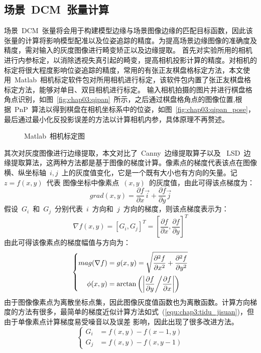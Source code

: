 \subsection{场景~DCM~张量计算}
\label{sec:Edge Point Mapping}
场景~DCM~张量将会用于构建模型边缘与场景图像边缘的匹配目标函数，因此该张量的计算将影响模型配准以及位姿追踪的精度。为提高场景边缘图像的准确度及精度，需对输入的灰度图像进行畸变矫正以及边缘提取。
首先对实验所用的相机进行内参标定，以消除透视失真引起的畸变，提高相机投影计算的精度。对相机的标定将很大程度影响位姿追踪的精度，常用的有张正友棋盘格标定方法，本文使用~Matlab~相机标定软件包对所用相机进行标定，该软件包内置了张正友棋盘格标定方法，能够对单目、双目相机进行标定。
输入相机拍摄的图片并进行棋盘格角点识别，如图~\ref{fig:chap03:qipan}~所示，之后通过棋盘格角点的图像位置,根据~PnP~算法以得到棋盘在相机坐标系中的位姿，如图~\ref{fig:chap03:qipan_pose}，最后通过最小化反投影误差的方法以计算相机内参，具体原理不再赘述。
\begin{figure}[t] %
  \centering%
  \caption{Matlab~相机标定图}
  \label{fig:chap03:matlab_calib}
\end{figure}
其次对灰度图像进行边缘提取，本文对比了~Canny~边缘提取算子以及
~LSD~边缘提取算法，这两种方法都是基于图像的梯度计算。像素点的梯度代表该点在图像横、纵坐标轴~$i,j$~上的灰度值变化，它是一个既有大小也有方向的矢量。记~$z=f(x,y)$~代表
图像坐标中像素点~$(x,y)$~的灰度值，由此可得该点梯度为：
\begin{equation}
grad(x,y)=\frac{\partial f}{\partial x}\vec i+\frac{\partial f}{\partial y}\vec j
\end{equation}
假设~$G_i$~和~$G_j$~分别代表~$i$~方向和~$j$~方向的梯度，则该点梯度表示为：
\begin{equation}
  \nabla f(x,y)=[G_i,G_j]^T=\left[\frac{\partial f}{\partial x},\frac{\partial f}{\partial y}\right]^T
\end{equation}
由此可得该像素点的梯度幅值与方向为：
\begin{equation}
  \left\{
    \begin{aligned}{}
    mag(\nabla f)&=g(x,y)=\sqrt{\frac{\partial ^2f}{\partial x^2}+\frac{\partial ^2f}{\partial y^2}} \\
    \phi(x,y)&=\arctan\left(\left| \frac{\partial f}{\partial y} \middle / \frac{\partial f}{\partial x}\right|\right)
    \end{aligned}
    \right.
\end{equation}
由于图像像素点为离散坐标点集，因此图像灰度值函数也为离散函数。计算方向梯度的方法有很多，最简单的梯度近似计算方法如式~(\ref{equ:chap3:tidu_jisuan})，但由于单像素点计算梯度易受噪音以及误差
影响，因此出现了很多改进方法。
\begin{equation}
  \label{equ:chap3:tidu_jisuan}
  \left\{
    \begin{aligned}{}
    G_i&=f(x,y)-f(x-1,y) \\
    G_j&=f(x,y)-f(x,y-1)
    \end{aligned}
    \right.
\end{equation}

